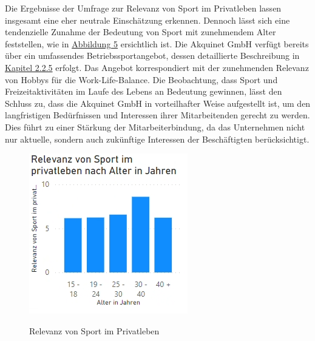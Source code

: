 Die Ergebnisse der Umfrage zur Relevanz von Sport im Privatleben lassen insgesamt eine eher neutrale Einschätzung erkennen. Dennoch lässt sich eine tendenzielle Zunahme der Bedeutung von Sport mit zunehmendem Alter feststellen, wie in \hyperref[abb:sport]{Abbildung 5} ersichtlich ist.\newline
Die Akquinet GmbH verfügt bereits über ein umfassendes Betriebssportangebot, dessen detaillierte Beschreibung in \hyperref[sec:betriebssport]{Kapitel 2.2.5} erfolgt. Das Angebot korrespondiert mit der zunehmenden Relevanz von Hobbys für die Work-Life-Balance. Die Beobachtung, dass Sport und Freizeitaktivitäten im Laufe des Lebens an Bedeutung gewinnen, lässt den Schluss zu, dass die Akquinet GmbH in vorteilhafter Weise aufgestellt ist, um den langfristigen Bedürfnissen und Interessen ihrer Mitarbeitenden gerecht zu werden. Dies führt zu einer Stärkung der Mitarbeiterbindung, da das Unternehmen nicht nur aktuelle, sondern auch zukünftige Interessen der Beschäftigten berücksichtigt.
\begin{figure}[H]
    \centering
    \includegraphics[scale = 0.7]{fig/sport.png}
    \label{abb:sport}
    \caption{Relevanz von Sport im Privatleben}
\end{figure}

